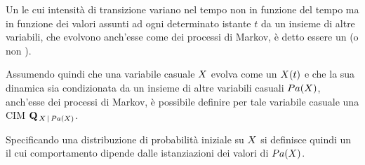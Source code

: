 \begin{definizione}[\upcase\mprocess*{} \cond*{}]
\label{defn:conditional-markov-process}
Un \mprocess*{} le cui intensità di transizione variano nel tempo non in funzione del tempo ma in funzione dei valori assunti ad ogni determinato istante $t$ da un insieme di altre variabili, che evolvono anch'esse come dei processi di Markov, è detto essere un \mprocess*{} \cond*{} (o \mprocess*{} non \omog*{}).

Assumendo quindi che una variabile casuale $\mathnormal{X}$ evolva come un \mprocess*{} $\mathnormal{X}(t)$ e che la sua dinamica sia condizionata da un insieme di altre variabili casuali $Pa(\mathnormal{X})$, anch'esse dei processi di Markov, è possibile definire per tale variabile casuale una \acf{CIM} $\mathbf{Q}_{\,\mathnormal{X}\,\arrowvert\,Pa(\mathnormal{X})}$.

Specificando una distribuzione di probabilità iniziale su $\mathnormal{X}$ si definisce quindi un \mprocess*{} il cui comportamento dipende dalle istanziazioni dei valori di $Pa(\mathnormal{X})$.
\end{definizione}

